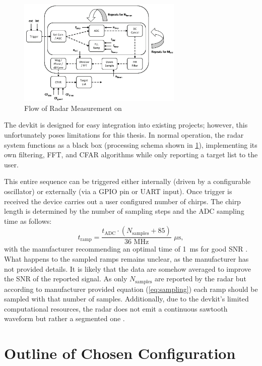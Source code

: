\begin{figure}[h!]
	\centering
	\includegraphics[width=0.7\textwidth]{../img/sidar_flow.png}
	\caption[Flow of Radar Measurement on \sidar \cite{sidarPRO}]{Flow of Radar Measurement on \sidar}
	\label{fig:sidarFlow}
\end{figure}

The devkit is designed for easy integration into existing projects; however, this unfortunately poses limitations for this thesis.
In normal operation, the radar system functions as a black box (processing schema shown in \ref{fig:sidarFlow}), implementing its own filtering, FFT, and CFAR algorithms while only reporting a target list to the user.

This entire sequence can be triggered either internally (driven by a configurable oscillator) or externally (via a GPIO pin or UART input).
Once trigger is received the device carries out a user configured number of chirps.
The chirp length is determined by the number of sampling steps and the ADC sampling time as follows:
\begin{equation}
	t_\mathrm{ramp} = \frac{t_\mathrm{ADC} \cdot  (N_\mathrm{samples} + 85)}{36\,\, \mathrm{MHz}} \,\, \mu\mathrm{s},
	\label{eq:sampling}
\end{equation}
with the manufacturer recommending an optimal time of 1~ms for good SNR \cite{sidarPRO}.
What happens to the sampled ramps remains unclear, as the manufacturer has not provided details.
It is likely that the data are somehow averaged to improve the SNR of the reported signal.
As only $N_\mathrm{samples}$ are reported by the radar but according to manufacturer provided equation (\ref{eq:sampling}) each ramp should be sampled with that number of samples.
Additionally, due to the devkit's limited computational resources, the radar does not emit a continuous sawtooth waveform but rather a segmented one \cite{sidarPRO}.

\section{Outline of Chosen Configuration }


